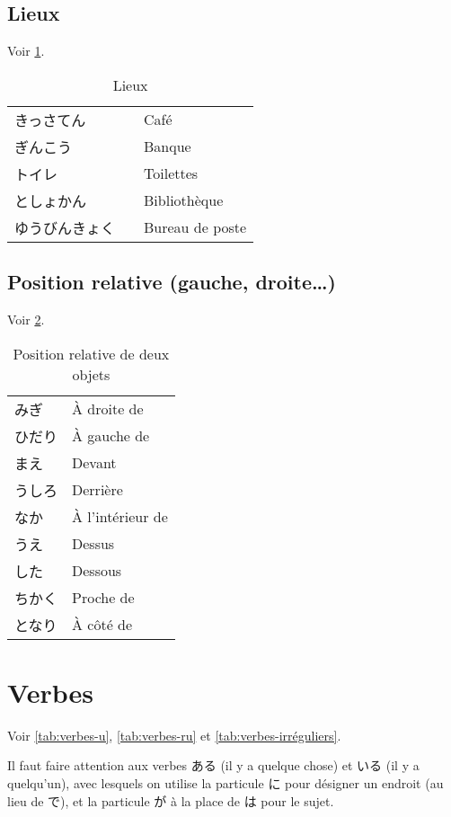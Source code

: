 \documentclass[a4paper,10pt,french,openany]{memoir}
\begin{document}
\subsection{Lieux}

Voir \cref{tab:lieux}.

\begin{table}[h]
 \centering
 \caption{Lieux}
 \label{tab:lieux}
 \begin{tabular}{lll}
  きっさてん &  & Café \\
  ぎんこう &  & Banque \\
  トイレ &  & Toilettes \\
  としょかん &  & Bibliothèque \\
  ゆうびんきょく &  & Bureau de poste \\
 \end{tabular}
\end{table}

\subsection{Position relative (gauche, droite\dots)}

Voir \cref{tab:position-relative}.

\begin{table}[h]
 \centering
 \caption{Position relative de deux objets}
 \label{tab:position-relative}
 \begin{tabular}{ll}
  みぎ & À droite de \\
  ひだり & À gauche de \\
  まえ & Devant \\
  うしろ & Derrière \\
  なか & À l'intérieur de \\
  うえ & Dessus \\
  した & Dessous \\
  ちかく & Proche de \\
  となり & À côté de \\
 \end{tabular}
\end{table}

\section{Verbes}

Voir \autoref{tab:verbes-u}, \autoref{tab:verbes-ru} et \autoref{tab:verbes-irréguliers}.

Il faut faire attention aux verbes ある (il y a quelque chose) et いる (il y a quelqu'un), avec lesquels on utilise la particule に pour désigner un endroit (au lieu de で), et la particule が à la place de は pour le sujet.
\end{document}
